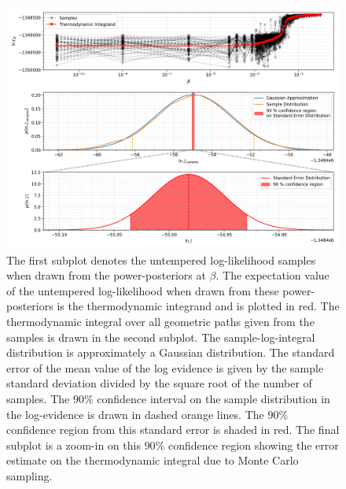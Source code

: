\begin{figure}[th]
\centering
\includegraphics[width=1.0\textwidth]{figs/chapter6/ti_monte_carlo_error.png}
\caption{The first subplot denotes the untempered log-likelihood samples when drawn from the power-posteriors at $\beta$. The expectation value of the untempered log-likelihood when drawn from these power-posteriors is the thermodynamic integrand and is plotted in red. The thermodynamic integral over all geometric paths given from the samples is drawn in the second subplot. The sample-log-integral distribution is approximately a Gaussian distribution. The standard error of the mean value of the log evidence is given by the sample standard deviation divided by the square root of the number of samples. The $90 \%$ confidence interval on the sample distribution in the log-evidence is drawn in dashed orange lines. The $90\%$ confidence region from this standard error is shaded in red. The final subplot is a zoom-in on this $90 \%$ confidence region showing the error estimate on the thermodynamic integral due to Monte Carlo sampling.}
\label{fig:ti_monte_carlo_error}
\end{figure}

